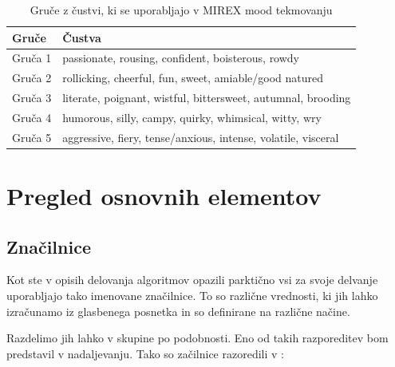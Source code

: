 \documentclass[a4paper, 12pt]{book}
\begin{document}
{\begin{table}[htb]
	\caption{Gruče z čustvi, ki se uporabljajo v MIREX mood tekmovanju}
    \begin{tabular}{|l|l|}
    \hline
    Gruče   & Čustva  \\
    \hline                                                      
    Gruča 1 & passionate, rousing, confident, boisterous, rowdy             \\
    Gruča 2 & rollicking, cheerful, fun, sweet, amiable/good natured        \\
    Gruča 3 & literate, poignant, wistful, bittersweet, autumnal, brooding  \\
    Gruča 4 & humorous, silly, campy, quirky, whimsical, witty, wry         \\
    Gruča 5 & aggressive, fiery, tense/anxious, intense, volatile, visceral \\
    \hline
    \end{tabular} 
    \label{mirextask}   
\end{table}

\section{Pregled osnovnih elementov}

\subsection{Značilnice}

Kot ste v opisih delovanja algoritmov opazili parktično vsi za svoje delvanje uporabljajo tako imenovane značilnice. To so različne vrednosti, ki jih lahko izračunamo iz glasbenega posnetka in so definirane na različne načine.

Razdelimo jih lahko v skupine po podobnosti. Eno od takih razporeditev bom predstavil v nadaljevanju. Tako so začilnice razoredili v \cite{laurier2007audio}:

}
\end{document}
